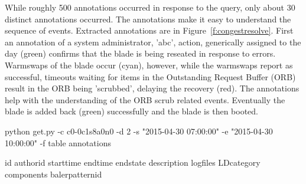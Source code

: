 While roughly 500 annotations occurred in response to the query,
only about 30 distinct annotations occurred. The annotations make it easy to understand the sequence of events. Extracted annotations are in Figure~\ref{f:congestresolve}.
First an annotation of a system administrator, 'abc', action, generically assigned to the day (green) confirms that the blade is being reseated in response
to errors. Warmswaps of the blade occur (cyan), however, while the warmswaps report as successful, timeouts waiting for items in the Outstanding Request Buffer (ORB)
result in the ORB being 'scrubbed', delaying the recovery (red). The annotations help with the understanding of the ORB scrub related events.
Eventually the blade is added back (green) successfully and the blade is then booted.

\begin{figure*}
\begin{annol}

python get.py  -c c0-0c1s8a0n0 -d 2 -s "2015-04-30 07:00:00" -e "2015-04-30 10:00:00" -f table annotations

id	authorid	starttime	endtime		endstate    description	logfiles	LDcategory	components	balerpatternid


\end{annol}
\end{figure*}
